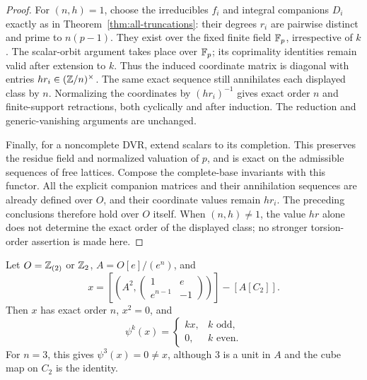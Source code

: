 \begin{proof}
For $(n,h)=1$, choose the irreducibles $f_i$ and integral companions
$D_i$ exactly as in Theorem~\ref{thm:all-truncations}: their degrees
$r_i$ are pairwise distinct and prime to $n(p-1)$.
They exist over the fixed finite field $\mathbb F_p$, irrespective of $k$.
The scalar-orbit argument takes place over $\mathbb F_p$; its coprimality
identities remain valid after extension to $k$.
Thus the induced coordinate matrix is diagonal with entries
$hr_i\in(\mathbb Z/n)^\times$.
The same exact sequence still annihilates each displayed class
by $n$.  Normalizing the coordinates by $(hr_i)^{-1}$ gives exact
order $n$ and finite-support retractions, both cyclically and after
induction.  The reduction and generic-vanishing arguments are
unchanged.

Finally, for a noncomplete DVR, extend scalars to its completion.
This preserves the residue field and normalized valuation of $p$,
and is exact on the admissible sequences of free lattices.
Compose the complete-base invariants with this functor.  All the
explicit companion matrices and their annihilation sequences are
already defined over $O$, and their coordinate values remain $hr_i$.
The preceding conclusions therefore hold over $O$ itself.
When $(n,h)\ne1$, the value $hr$ alone does not determine the exact
order of the displayed class; no stronger torsion-order assertion
is made here.
\end{proof}

\begin{corollary}\label{cor:truncation-adams}
Let $O=\mathbb Z_{(2)}$ or $\mathbb Z_2$, $A=O[e]/(e^n)$, and
\[
 x=\left[\left(A^2,
       \begin{pmatrix}1&e\\e^{n-1}&-1\end{pmatrix}\right)\right]
       -[A[C_2]].
\]
Then $x$ has exact order $n$, $x^2=0$, and
\[
 \psi^k(x)=\begin{cases}kx,&k\text{ odd},\\0,&k\text{ even}.
                         \end{cases}
\]
For $n=3$, this gives $\psi^3(x)=0\ne x$, although $3$ is a unit
in $A$ and the cube map on $C_2$ is the identity.
\end{corollary}

